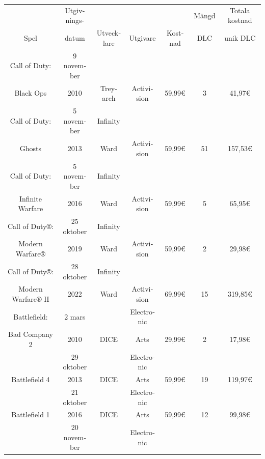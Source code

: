 \documentclass[11p]{article}
\begin{document}
\begin{otherlanguage}{swedish}
    \begin{table}[htbp]
        \centering
        \setlength\tabcolsep{2pt}
        \begin{tabular}{|c|c|c|c|c|c|c|}
            \hline
                 & Utgivnings- &            &          &         & Mängd & Totala kostnad \\[-2pt]%
            Spel & datum       & Utvecklare & Utgivare & Kostnad & DLC   & unik DLC \\
            \hline
            Call of Duty: & 9 november &&&&&\\ [-2pt]
            Black Ops     & 2010       & Treyarch & Activision & 59,99€ & 3 & 41,97€ \\
            \hline
            Call of Duty: & 5 november & Infinity &&&&\\ [-2pt]
            Ghosts        & 2013       & Ward     & Activision & 59,99€ & 51 & 157,53€ \\ %
            \hline
            Call of Duty:    & 5 november & Infinity &&&&\\ [-2pt]
            Infinite Warfare & 2016       & Ward     & Activision & 59,99€ & 5 & 65,95€ \\
            \hline
            Call of Duty®:  & 25 oktober & Infinity &&&&\\ [-2pt]
            Modern Warfare® & 2019       & Ward     & Activision & 59,99€ & 2 & 29,98€ \\
            \hline
            Call of Duty®:     & 28 oktober & Infinity &&&&\\ [-2pt]
            Modern Warfare® II & 2022       & Ward     & Activision & 69,99€ & 15 & 319,85€ \\
            \hline
            Battlefield:  &  2 mars && Electronic &&&\\ [-2pt]
            Bad Company 2 & 2010 & DICE & Arts & 29,99€ & 2 & 17,98€\\
            \hline
            & 29 oktober && Electronic &&&\\ [-2pt]
            Battlefield 4 & 2013 & DICE & Arts & 59,99€ & 19 & 119,97€\\
            \hline
            & 21 oktober && Electronic &&&\\ [-2pt]
            Battlefield 1 & 2016 & DICE & Arts & 59,99€ & 12 & 99,98€\\
            \hline
            & 20 november && Electronic &&&\\ [-2pt]

\end{tabular}
\end{table}
\end{otherlanguage}
\end{document}
